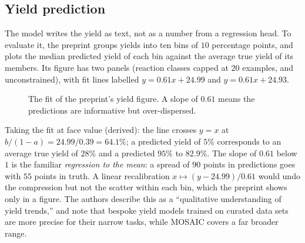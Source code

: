 \documentclass[11pt]{article}
\begin{document}
\subsection*{Yield prediction}
The model writes the yield as text, not as a number from a regression head. To evaluate it, the preprint groups yields into ten bins of $10$ percentage points, and plots the median predicted yield of each bin against the average true yield of its members. Its figure has two panels (reaction classes capped at $20$ examples, and unconstrained), with fit lines labelled $y=0.61x+24.99$ and $y=0.61x+24.93$.

\begin{figure}[ht]
\centering
{}
\caption{The fit of the preprint's yield figure. A slope of $0.61$ means the predictions are informative but over-dispersed.}
\label{fig:yield}
\end{figure}

Taking the fit at face value (derived): the line crosses $y=x$ at $b/(1-a)=24.99/0.39=64.1\%$; a predicted yield of $5\%$ corresponds to an average true yield of $28\%$ and a predicted $95\%$ to $82.9\%$. The slope of $0.61$ below $1$ is the familiar \emph{regression to the mean}: a spread of $90$ points in predictions goes with $55$ points in truth. A linear recalibration $x\mapsto(y-24.99)/0.61$ would undo the compression but not the scatter within each bin, which the preprint shows only in a figure. The authors describe this as a ``qualitative understanding of yield trends,'' and note that bespoke yield models trained on curated data sets are more precise for their narrow tasks, while MOSAIC covers a far broader range.
\end{document}

